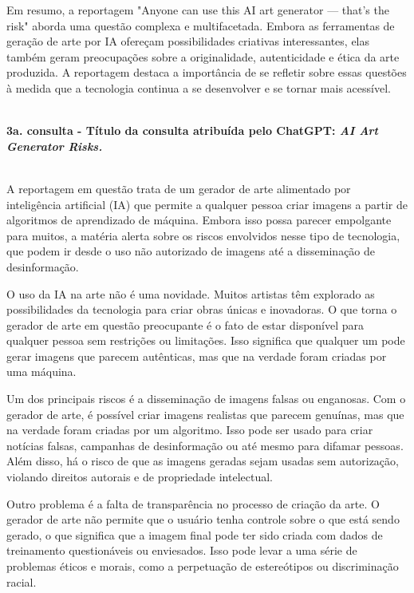 Em resumo, a reportagem "Anyone can use this AI art generator — that’s the risk" aborda uma questão complexa e
multifacetada. Embora as ferramentas de geração de arte por IA ofereçam possibilidades criativas interessantes, 
elas também geram preocupações sobre a originalidade, autenticidade e ética da arte produzida. 
A reportagem destaca a importância de se refletir sobre essas questões à medida que a tecnologia continua a se 
desenvolver e se tornar mais acessível.

~\\ 

\textbf{3a. consulta - Título da consulta atribuída pelo ChatGPT: \textit{AI Art Generator Risks.}}

~\\

A reportagem em questão trata de um gerador de arte alimentado por inteligência artificial (IA) 
que permite a qualquer pessoa criar imagens a partir de algoritmos de aprendizado de máquina. 
Embora isso possa parecer empolgante para muitos, a matéria alerta sobre os riscos envolvidos 
nesse tipo de tecnologia, que podem ir desde o uso não autorizado de imagens até a disseminação de desinformação.

O uso da IA na arte não é uma novidade. Muitos artistas têm explorado as possibilidades 
da tecnologia para criar obras únicas e inovadoras. O que torna o gerador de arte em questão preocupante é o
fato de estar disponível para qualquer pessoa sem restrições ou limitações. Isso significa que qualquer um 
pode gerar imagens que parecem autênticas, mas que na verdade foram criadas por uma máquina.

Um dos principais riscos é a disseminação de imagens falsas ou enganosas. Com o gerador de arte, 
é possível criar imagens realistas que parecem genuínas, mas que na verdade foram criadas por um algoritmo. 
Isso pode ser usado para criar notícias falsas, campanhas de desinformação ou até mesmo para difamar pessoas. 
Além disso, há o risco de que as imagens geradas sejam usadas sem autorização, violando direitos autorais e de 
propriedade intelectual.

Outro problema é a falta de transparência no processo de criação da arte. O gerador de arte não permite
que o usuário tenha controle sobre o que está sendo gerado, o que significa que a imagem final pode ter 
sido criada com dados de treinamento questionáveis ou enviesados. Isso pode levar a uma série de problemas 
éticos e morais, como a perpetuação de estereótipos ou discriminação racial.

